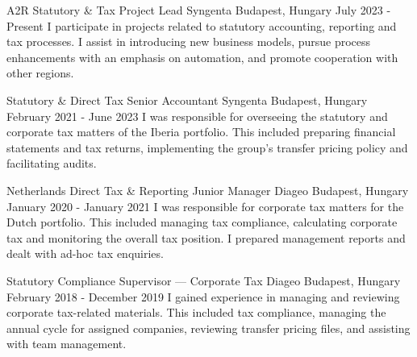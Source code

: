


\begin{cventries}


  \cventry
    {A2R Statutory \& Tax Project Lead} %
    {Syngenta} %
    {Budapest, Hungary} %
    {July 2023 - Present} %
    {} %
    {I participate in projects related to statutory accounting, reporting and tax processes. I assist in introducing new business models, pursue process enhancements with an emphasis on automation, and promote cooperation with other regions.} %


  \cventry
    {Statutory \& Direct Tax Senior Accountant} %
    {Syngenta} %
    {Budapest, Hungary} %
    {February 2021 - June 2023} %
    {} %
    {I was responsible for overseeing the statutory and corporate tax matters of the Iberia portfolio. This included preparing financial statements and tax returns, implementing the group's transfer pricing policy and facilitating audits.} %


  \cventry
    {Netherlands Direct Tax \& Reporting Junior Manager} %
    {Diageo} %
    {Budapest, Hungary} %
    {January 2020 - January 2021} %
    {} %
    {I was responsible for corporate tax matters for the Dutch portfolio. This included managing tax compliance, calculating corporate tax and monitoring the overall tax position. I prepared management reports and dealt with ad-hoc tax enquiries.} %


  \cventry
    {Statutory Compliance Supervisor — Corporate Tax} %
    {Diageo} %
    {Budapest, Hungary} %
    {February 2018 - December 2019} %
    {} %
    {I gained experience in managing and reviewing corporate tax-related materials. This included tax compliance, managing the annual cycle for assigned companies, reviewing transfer pricing files, and assisting with team management.} %


\end{cventries}
